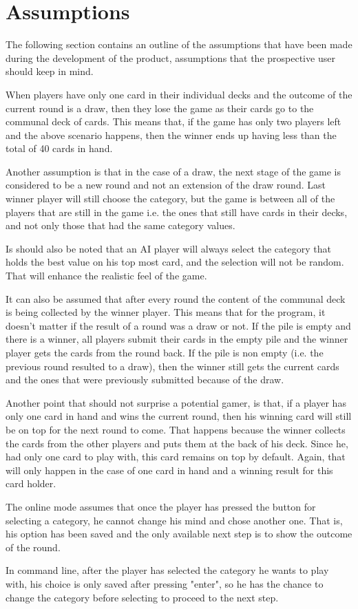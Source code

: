 \newpage
\section{Assumptions}

The following section contains an outline of the assumptions that have been made during the development of the product, assumptions that the prospective user should keep in mind.

When players have only one card in their individual decks and the outcome of the current round is a draw, then they lose the game as their cards go to the communal deck of cards. This means that, if the game has only two players left and the above scenario happens, then the winner ends up having less than the total of 40 cards in hand.

Another assumption is that in the case of a draw, the next stage of the game is considered to be a new round and not an extension of the draw round. Last winner player will still choose the category, but the game is between all of the players that are still in the game i.e. the ones that still have cards in their decks, and not only those that had the same category values.

Is should also be noted that an AI player will always select the category that holds the best value on his top most card, and the selection will not be random. That will enhance the realistic feel of the game.

It can also be assumed that after every round the content of the communal deck is being collected by the winner player. This means that for the program, it doesn't matter if the result of a round was a draw or not. If the pile is empty and there is a winner, all players submit their cards in the empty pile and the winner player gets the cards from the round back. If the pile is non empty (i.e. the previous round resulted to a draw), then the winner still gets the current cards and the ones that were previously submitted because of the draw.

Another point that should not surprise a potential gamer, is that, if a player has only one card in hand and wins the current round, then his winning card will still be on top for the next round to come. That happens because the winner collects the cards from the other players and puts them at the back of his deck. Since he, had only one card to play with, this card remains on top by default. Again, that will only happen in the case of one card in hand and a winning result for this card holder. 

The online mode assumes that once the player has pressed the button for selecting a category, he cannot change his mind and chose another one. That is, his option has been saved and the only available next step is to show the outcome of the round.

In command line, after the player has selected the category he wants to play with, his choice is only saved after pressing "enter", so he has the chance to change the category before selecting to proceed to the next step.


